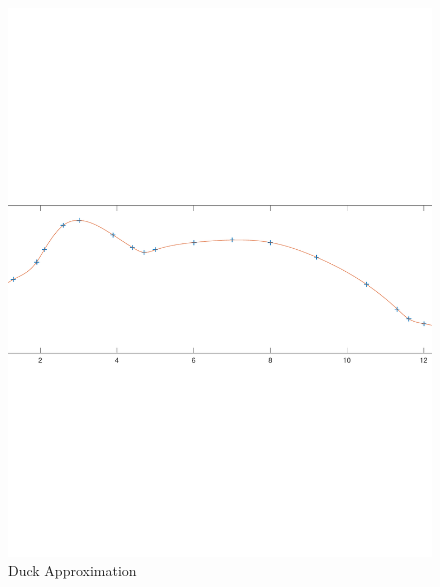 \documentclass{article}
\begin{document}

\begin{figure}[h]
\centering
\caption{Duck Approximation}
\includegraphics[scale=0.6]{duck}
\end{figure}
\end{document}
